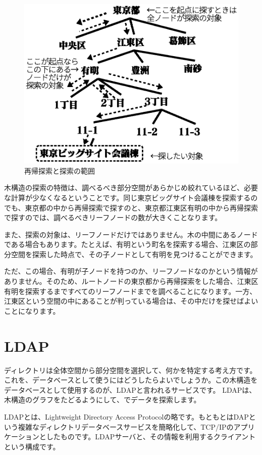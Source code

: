 \begin{figure}[htbp]
	\includegraphics[width=12cm,clip]{draw/recursive.eps}
	\caption{再帰探索と探索の範囲}
	\label{fig:recursive}
\end{figure}

木構造の探索の特徴は、調べるべき部分空間があらかじめ絞れているほど、必要な計算が少なくなるということです。同じ東京ビッグサイト会議棟を探索するのでも、東京都の中から再帰探索で探すのと、東京都江東区有明の中から再帰探索で探すのでは、調べるべきリーフノードの数が大きくことなります。

また、探索の対象は、リーフノードだけではありません。木の中間にあるノードである場合もあります。たとえば、有明という町名を探索する場合、江東区の部分空間を探索した時点で、その子ノードとして有明を見つけることができます。

ただ、この場合、有明が子ノードを持つのか、リーフノードなのかという情報がありません。そのため、ルートノードの東京都から再帰探索をした場合、江東区有明を探索するまですべてのリーフノードまでを調べることになります。一方、江東区という空間の中にあることが判っている場合は、その中だけを探せばよいことになります。

\section{LDAP}

ディレクトリは全体空間から部分空間を選択して、何かを特定する考え方です。これを、データベースとして使うにはどうしたらよいでしょうか。この木構造をデータベースとして使用するのが、LDAPと言われるサービスです。
LDAPは、木構造のグラフをたどるようにして、でデータを探索します。

LDAPとは、Lightweight Directory Access Protocolの略です。もともとはDAPという複雑なディレクトリデータベースサービスを簡略化して、TCP/IPのアプリケーションとしたものです。LDAPサーバと、その情報を利用するクライアントという構成です。

